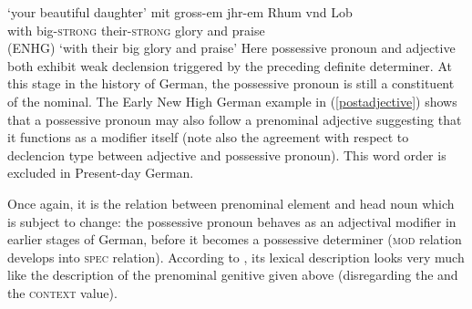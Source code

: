 \documentclass[output=paper
                ,modfonts
                ,nonflat
	        ,collection
	        ,collectionchapter
	        ,collectiontoclongg
 	        ,biblatex
                ,babelshorthands
                ,newtxmath
                ,draftmode
                ,colorlinks, citecolor=brown
]{./langsci/langscibook}
\begin{document}
\glt `your beautiful daughter'
\ex \label{postadjective}
\gll mit gross-em jhr-em Rhum vnd Lob \\ with big-\textsc{strong} their-\textsc{strong} glory and praise   \\ \hfill (ENHG)
\glt `with their big glory and praise'
\zl
Here possessive pronoun and adjective both exhibit weak declension triggered by the preceding definite determiner. At this stage in the history of German, the possessive pronoun is still a constituent of the nominal. The Early New High German example in (\ref{postadjective}) shows that a possessive pronoun may also follow a prenominal adjective suggesting that it functions as a modifier itself (note also the agreement with respect to declencion type between adjective and possessive pronoun). This word order is excluded in Present-day German.

Once again, it is the relation between prenominal element and head noun which is subject to change: the possessive pronoun behaves as an adjectival modifier in earlier stages of German, before it becomes a possessive determiner (\ie \textsc{mod} relation develops into \textsc{spec} relation). According to \cite[54]{PoSa94}, its lexical description looks very much like the description of the prenominal genitive given above (disregarding the \content and the \textsc{context} value).
\end{document}

